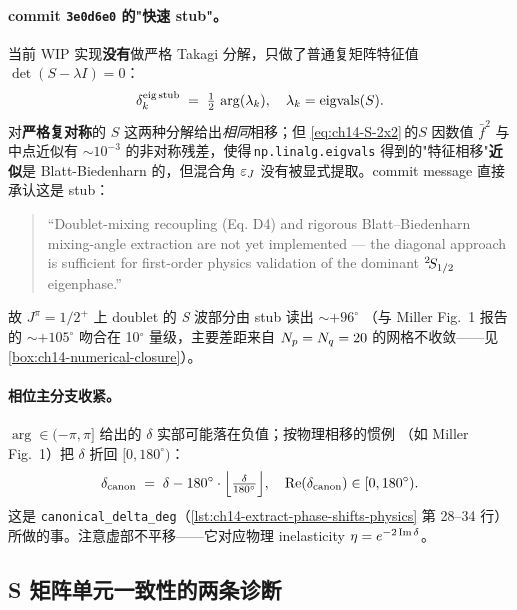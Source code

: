 \paragraph{commit \texttt{3e0d6e0} 的"快速 stub"。}
当前 WIP 实现\textbf{没有}做严格 Takagi 分解，只做了普通复矩阵特征值
\(\det(S - \lambda I) = 0\)：
\begin{equation}
\label{eq:ch14-eig-stub}
\delta^{\rm eig\,stub}_k \;=\; \tfrac{1}{2}\,\arg(\lambda_k),
\quad
\lambda_k = \text{eigvals}(S).
\end{equation}
对\textbf{严格复对称}的 \(S\) 这两种分解给出\emph{相同}相移；但
\cref{eq:ch14-S-2x2}\(\,\)的\(S\) 因数值 \(\bar{f}^2\) 与中点近似有
\(\sim\!10^{-3}\) 的非对称残差，使得\(\,\)\verb|np.linalg.eigvals|
得到的"特征相移"\textbf{近似}是 Blatt-Biedenharn 的，但混合角 \(\varepsilon_J\)
没有被显式提取。commit message 直接承认这是 stub：
\begin{quote}
``Doublet-mixing recoupling (Eq. D4) and rigorous Blatt--Biedenharn
mixing-angle extraction are not yet implemented — the diagonal approach is
sufficient for first-order physics validation of the dominant
\({}^{2}\!S_{1/2}\) eigenphase.''
\end{quote}
故 \(J^\pi = 1/2^+\) 上 doublet 的 \emph{S} 波部分由 stub 读出 \(\sim +96^\circ\)
（与 Miller Fig.~1 报告的 \(\sim +105^\circ\) 吻合在 10\(^\circ\) 量级，主要差距来自
\(N_p = N_q = 20\) 的网格不收敛——见
\cref{box:ch14-numerical-closure}）。

\paragraph{相位主分支收紧。}
\(\arg \in (-\pi, \pi]\) 给出的 \(\delta\) 实部可能落在负值；按物理相移的惯例
（如 Miller Fig.~1）把 \(\delta\) 折回 \([0, 180^\circ)\)：
\begin{equation}
\label{eq:ch14-canonical-branch}
\delta_{\rm canon} \;=\; \delta - 180^\circ \cdot
\Big\lfloor \tfrac{\delta}{180^\circ}\Big\rfloor,
\quad \text{Re}(\delta_{\rm canon}) \in [0, 180^\circ).
\end{equation}
这是 \texttt{canonical\_delta\_deg}（\cref{lst:ch14-extract-phase-shifts-physics}
第 28--34 行）所做的事。注意虚部不平移——它对应物理 inelasticity \(\eta = e^{-2\operatorname{Im}\delta}\)。

\subsection{S 矩阵单元一致性的两条诊断}
\label{subsec:ch14-unitarity}

